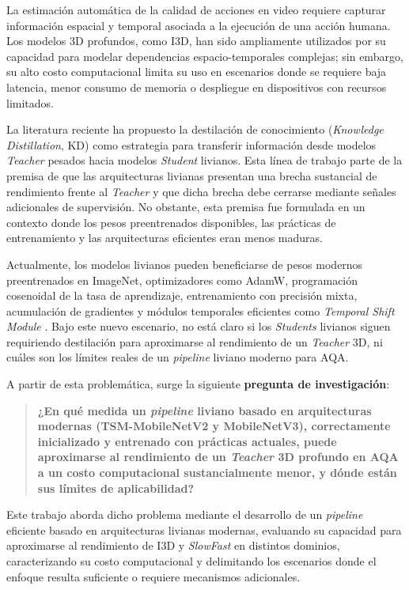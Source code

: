 La estimación automática de la calidad de acciones en video requiere capturar información espacial y temporal asociada a la ejecución de una acción humana. Los modelos 3D profundos, como \ac{I3D}, han sido ampliamente utilizados por su capacidad para modelar dependencias espacio-temporales complejas; sin embargo, su alto costo computacional limita su uso en escenarios donde se requiere baja latencia, menor consumo de memoria o despliegue en dispositivos con recursos limitados.

La literatura reciente ha propuesto la destilación de conocimiento (\textit{Knowledge Distillation}, KD) \cite{Hinton2015Distilling} como estrategia para transferir información desde modelos \textit{Teacher} pesados hacia modelos \textit{Student} livianos. Esta línea de trabajo \cite{Yu2021GroupAware,Mun2019TKD,Cai2023VisionLanguageAQA} parte de la premisa de que las arquitecturas livianas presentan una brecha sustancial de rendimiento frente al \textit{Teacher} y que dicha brecha debe cerrarse mediante señales adicionales de supervisión. No obstante, esta premisa fue formulada en un contexto donde los pesos preentrenados disponibles, las prácticas de entrenamiento y las arquitecturas eficientes eran menos maduras.

Actualmente, los modelos livianos pueden beneficiarse de pesos modernos preentrenados en ImageNet, optimizadores como AdamW, programación cosenoidal de la tasa de aprendizaje, entrenamiento con precisión mixta, acumulación de gradientes y módulos temporales eficientes como \textit{Temporal Shift Module} \cite{Lin2019TSM}. Bajo este nuevo escenario, no está claro si los \textit{Students} livianos siguen requiriendo destilación para aproximarse al rendimiento de un \textit{Teacher} 3D, ni cuáles son los límites reales de un \textit{pipeline} liviano moderno para \ac{AQA}.

A partir de esta problemática, surge la siguiente \textbf{pregunta de investigación}:

\begin{quote}
\textbf{¿En qué medida un \textit{pipeline} liviano basado en arquitecturas modernas (TSM-MobileNetV2 y MobileNetV3), correctamente inicializado y entrenado con prácticas actuales, puede aproximarse al rendimiento de un \textit{Teacher} 3D profundo en \ac{AQA} a un costo computacional sustancialmente menor, y dónde están sus límites de aplicabilidad?}
\end{quote}

Este trabajo aborda dicho problema mediante el desarrollo de un \textit{pipeline} eficiente basado en arquitecturas livianas modernas, evaluando su capacidad para aproximarse al rendimiento de \ac{I3D} y \textit{SlowFast} en distintos dominios, caracterizando su costo computacional y delimitando los escenarios donde el enfoque resulta suficiente o requiere mecanismos adicionales.

